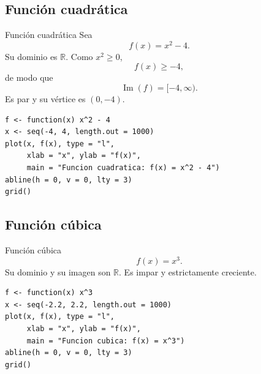 \documentclass[aspectratio=169,10pt]{beamer}
\newcommand{\R}{\mathbb{R}}
\newcommand{\Ima}{\operatorname{Im}}
\begin{document}
\subsection{Función cuadrática}
\begin{frame}{Función cuadrática}
Sea
\[
f(x)=x^2-4.
\]
Su dominio es $\R$. Como $x^2\geq0$,
\[
f(x)\geq-4,
\]
de modo que
\[
\Ima(f)=[-4,\infty).
\]
Es par y su vértice es $(0,-4)$.

\begin{center}
\end{center}

\begin{verbatim}
f <- function(x) x^2 - 4
x <- seq(-4, 4, length.out = 1000)
plot(x, f(x), type = "l",
     xlab = "x", ylab = "f(x)",
     main = "Funcion cuadratica: f(x) = x^2 - 4")
abline(h = 0, v = 0, lty = 3)
grid()
\end{verbatim}

\end{frame}
\subsection{Función cúbica}
\begin{frame}{Función cúbica}
\[
f(x)=x^3.
\]
Su dominio y su imagen son $\R$. Es impar y estrictamente creciente.

\begin{center}
\end{center}

\begin{verbatim}
f <- function(x) x^3
x <- seq(-2.2, 2.2, length.out = 1000)
plot(x, f(x), type = "l",
     xlab = "x", ylab = "f(x)",
     main = "Funcion cubica: f(x) = x^3")
abline(h = 0, v = 0, lty = 3)
grid()
\end{verbatim}

\end{frame}
\end{document}
